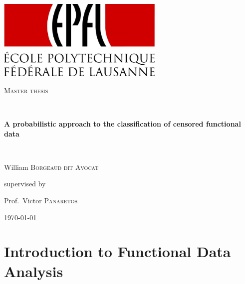 \documentclass[10pt, a4paper]{report}
\theoremstyle{definition}
\theoremstyle{remark}
\begin{document}
\begin{titlepage}
	\centering
	\includegraphics[width=0.6\textwidth]{EPFL-Logo}\par\vspace{1cm}
	\vspace{1cm}
	{\scshape\Large Master thesis\par}
	\vspace{1.5cm}
	\hrulefill \\
	{\huge\bfseries A probabilistic approach to the classification of censored functional data \par}
	\hrulefill \\
	\vspace{2cm}
	{\Large William \textsc{Borgeaud dit Avocat}\par}
	\vfill
	{\Large
	supervised by\par
	Prof.~Victor \textsc{Panaretos}}
	
	\vfill
	
	{\large \today\par}
\end{titlepage}

\tableofcontents

\chapter{Introduction to Functional Data Analysis}
\end{document}
